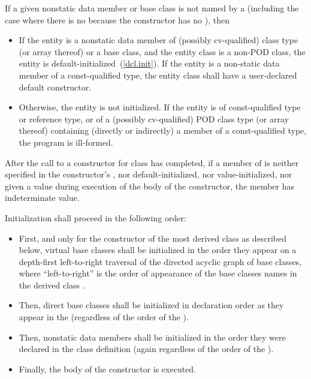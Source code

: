 \pnum
If a given nonstatic data member or base class is not named by a
(including the case where there is no
because the constructor has no
), then

\begin{itemize}
\item If the entity is a nonstatic data member of (possibly cv-qualified)
class type (or array thereof) or a base class, and the entity class is a
non-POD class, the entity is default-initialized~(\ref{dcl.init}). If the
entity is a non-static data member of a const-qualified type, the entity
class shall have a user-declared default constructor.
\item Otherwise, the entity is not initialized. If the entity is of
const-qualified type or reference type, or of a (possibly cv-qualified) POD
class type (or array thereof) containing (directly or indirectly) a member
of a const-qualified type, the program is ill-formed.
\end{itemize}

After the call to a constructor for class  has completed, if a
member of  is neither specified in the constructor's
, nor default-initialized, nor
value-initialized, nor given a value during execution of the body of the
constructor, the member has indeterminate value.

\pnum
Initialization shall proceed in the following order:

\begin{itemize}
\item
{}%
First, and only for the constructor of the most derived class as described
below,
virtual base classes shall be initialized in the order they appear on a
depth-first left-to-right traversal of the directed acyclic graph of
base classes,
where ``left-to-right'' is the order of appearance of the base classes
names in the derived class
.
\item
{}%
Then, direct base classes shall be initialized in declaration order
as they appear in the
(regardless of the order of the
).
\item
{}%
Then, nonstatic data members shall be initialized in the order
they were declared in the class definition
(again regardless of the order of the
).
\item
Finally, the body of the constructor is executed.
\end{itemize}

